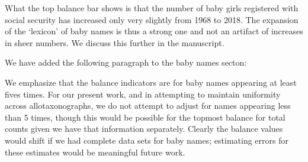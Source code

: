 What the top balance bar shows is that the number of baby girls registered with social security has
increased only very slightly from 1968 to 2018.
The expansion of the `lexicon' of baby names is thus a strong one
and not an artifact of increases in sheer numbers.
We discuss this further in the manuscript.

We have added the following paragraph to the baby names secton:
\begin{excerpt}
  We emphasize that the balance indicators are for baby names
  appearing at least fives times. For our present work, and in
  attempting to maintain uniformity across allotaxonographs, we do not
  attempt to adjust for names appearing less than 5 times, though this
  would be possible for the topmost balance for total counts given we
  have that information separately. Clearly the balance values would
  shift if we had complete data sets for baby names; estimating errors
  for these estimates would be meaningful future work.
\end{excerpt}










